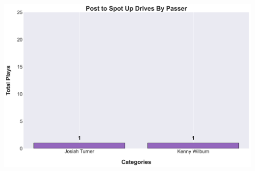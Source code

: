 \documentclass[a4paper,12pt]{article}
\begin{document}
\begin{table}[H]
{\begin{minipage}[t]{0.6\textwidth}
{\begin{tabular}
            \bottomrule
        \end{tabular}
        } %
    \end{minipage}
    } %
    \hfill %
    \begin{minipage}[c]{0.35\textwidth} %
        \flushright
        \includegraphics[width=\textwidth, height=.14\textheight]{images/SpotUp_PostDrivesPlayer_Freq.png} %
    \end{minipage}
\end{table}

\vspace{-1em} %
\vspace{-1em} %
\end{document}
